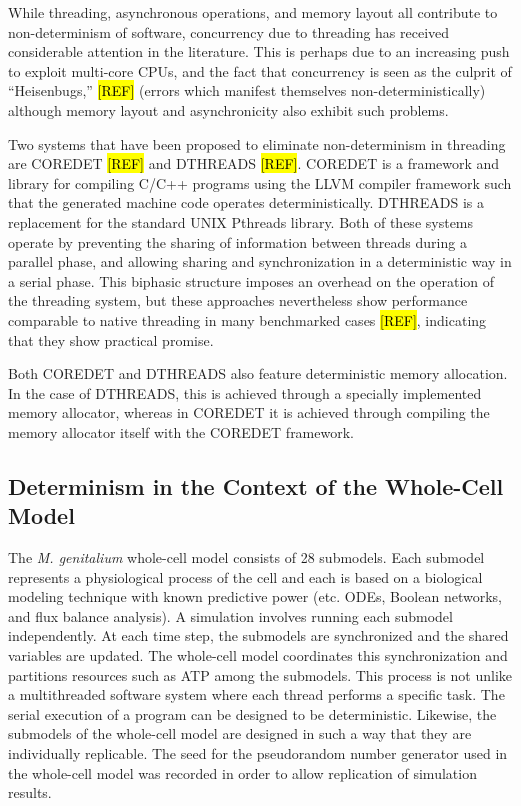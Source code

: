 \documentclass[journal,transmag]{IEEEtran}
\begin{document}
While threading, asynchronous operations, and memory layout all contribute
to non-determinism of software,
concurrency due to threading has received considerable attention in the literature.
This is perhaps due to an increasing push to exploit multi-core CPUs,
and the fact that concurrency is seen as the culprit of ``Heisenbugs,'' \hl{[REF]}
(errors which manifest themselves non-deterministically)
although memory layout and asynchronicity also exhibit such problems.

Two systems that have been proposed to eliminate non-determinism in threading
are C{\small ORE}D{\small ET} \hl{[REF]} and D{\small THREADS} \hl{[REF]}.
C{\small ORE}D{\small ET} is a framework and library for compiling C/C++ programs
using the LLVM compiler framework such that the generated machine code operates deterministically.
D{\small THREADS} is a replacement for the standard UNIX Pthreads library.
Both of these systems operate by preventing the sharing of information between
threads during a parallel phase, and allowing sharing and synchronization
in a deterministic way in a serial phase.
This biphasic structure imposes an overhead on the operation of the threading
system, but these approaches nevertheless show performance comparable to native
threading in many benchmarked cases \hl{[REF]}, indicating that they show
practical promise.

Both C{\small ORE}D{\small ET} and D{\small THREADS} also
feature deterministic memory allocation. In the case of D{\small THREADS},
this is achieved through a specially implemented memory allocator,
whereas in C{\small ORE}D{\small ET} it is achieved through compiling the
memory allocator itself with the C{\small ORE}D{\small ET} framework.

\subsection{Determinism in the Context of the Whole-Cell Model}

The \textit{M. genitalium} whole-cell model \cite{Karr2012} consists of
28 submodels.
Each submodel represents a physiological process of the cell
and each is based on a biological modeling technique with known predictive power
(etc. ODEs, Boolean networks, and flux balance analysis).
A simulation involves running each submodel independently. At each time step,
the submodels are synchronized and the shared variables are updated.
The whole-cell model coordinates this synchronization and partitions resources such as ATP
among the submodels.
This process is not unlike a multithreaded software system where each thread performs
a specific task. The serial execution of a program can be designed to be deterministic.
Likewise, the submodels of the whole-cell model are designed in such a way that
they are individually replicable. The seed for the pseudorandom number generator
used in the whole-cell model was recorded in order to allow replication of simulation results.
\end{document}

